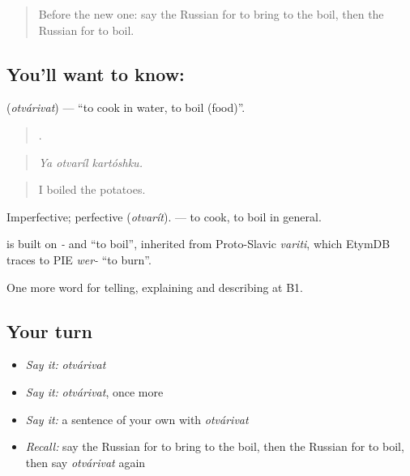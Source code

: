 \label{lesson:RU-C329-otvarivat}



\begin{quote}
Before the new one: say the Russian for to bring to the boil, then the Russian for to boil.
\end{quote}

\subsection*{You'll want to know: }
\textbf{} (\emph{otvárivat}) — \textquotedblleft{}to cook in water, to boil (food)\textquotedblright{}.

\begin{quote}
  .
\end{quote}

\begin{quote}
\emph{Ya otvaríl kartóshku.}
\end{quote}

\begin{quote}
I boiled the potatoes.
\end{quote}

Imperfective; perfective \emph{} (\emph{otvarít}). \emph{} — to cook, to boil in general.

\begin{cousinweb}
\emph{} is built on \emph{-} and \emph{} \textquotedblleft{}to boil\textquotedblright{}, inherited from Proto-Slavic \emph{variti}, which EtymDB traces to PIE \emph{wer-} \textquotedblleft{}to burn\textquotedblright{}.
\end{cousinweb}

\begin{grammarlens}[title={What you've built}]
One more word for telling, explaining and describing at B1.
\end{grammarlens}

\subsection*{Your turn}
\begin{itemize}
\raggedright
  \item \emph{Say it:} \emph{otvárivat}
  \item \emph{Say it:} \emph{otvárivat}, once more
  \item \emph{Say it:} a sentence of your own with \emph{otvárivat}
  \item \emph{Recall:} say the Russian for to bring to the boil, then the Russian for to boil, then say \emph{otvárivat} again
\end{itemize}

